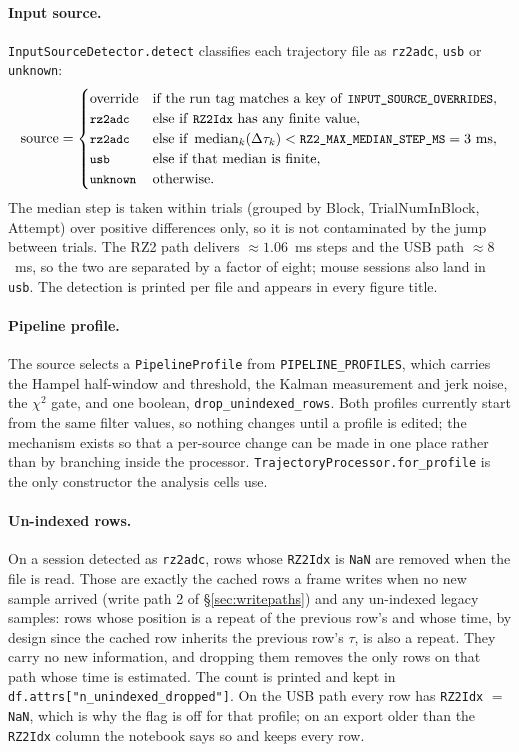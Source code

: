\documentclass[11pt,a4paper]{article}
\newcommand{\code}[1]{\texttt{\small #1}}
\begin{document}
\paragraph{Input source.} \code{InputSourceDetector.detect} classifies each
trajectory file as \code{rz2adc}, \code{usb} or \code{unknown}:
\begin{equation}
  \text{source} =
  \begin{cases}
    \text{override} & \text{if the run tag matches a key of \code{INPUT\_SOURCE\_OVERRIDES}},\\
    \code{rz2adc} & \text{else if \code{RZ2Idx} has any finite value},\\
    \code{rz2adc} & \text{else if } \operatorname{median}_k(\Delta \tau_k) < \code{RZ2\_MAX\_MEDIAN\_STEP\_MS} = 3\ \text{ms},\\
    \code{usb} & \text{else if that median is finite},\\
    \code{unknown} & \text{otherwise.}
  \end{cases}
  \label{eq:detect}
\end{equation}
The median step is taken within trials (grouped by Block, TrialNumInBlock,
Attempt) over positive differences only, so it is not contaminated by the jump
between trials. The RZ2 path delivers $\approx 1.06$~ms steps and the USB path
$\approx 8$~ms, so the two are separated by a factor of eight; mouse sessions
also land in \code{usb}. The detection is printed per file and appears in every
figure title.

\paragraph{Pipeline profile.} The source selects a \code{PipelineProfile} from
\code{PIPELINE\_PROFILES}, which carries the Hampel half-window and threshold,
the Kalman measurement and jerk noise, the $\chi^2$ gate, and one boolean,
\code{drop\_unindexed\_rows}. Both profiles currently start from the same filter
values, so nothing changes until a profile is edited; the mechanism exists so
that a per-source change can be made in one place rather than by branching
inside the processor. \code{TrajectoryProcessor.for\_profile} is the only
constructor the analysis cells use.

\paragraph{Un-indexed rows.} On a session detected as \code{rz2adc}, rows whose
\code{RZ2Idx} is \code{NaN} are removed when the file is read. Those are exactly
the cached rows a frame writes when no new sample arrived (write path 2 of
\S\ref{sec:writepaths}) and any un-indexed legacy samples: rows whose position
is a repeat of the previous row's and whose time, by design since the cached row
inherits the previous row's $\tau$, is also a repeat. They carry no new
information, and dropping them removes the only rows on that path whose time is
estimated. The count is printed and kept in
\code{df.attrs["n\_unindexed\_dropped"]}. On the USB path every row has
\code{RZ2Idx} $=$ \code{NaN}, which is why the flag is off for that profile; on
an export older than the \code{RZ2Idx} column the notebook says so and keeps
every row.
\end{document}
